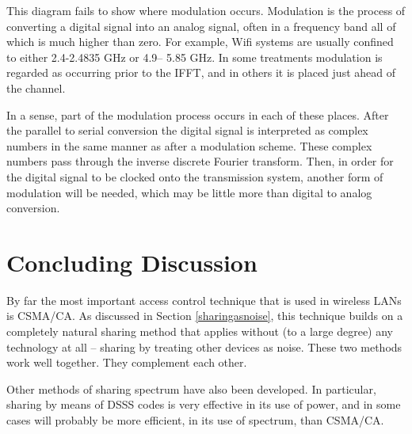 This diagram fails to show where modulation occurs. Modulation is the process of converting
a digital signal into an analog signal, often in a frequency band all of which is much higher
than zero. For example, Wifi systems are usually confined to either 2.4-2.4835 GHz or 4.9–
5.85 GHz. In some treatments modulation is regarded as occurring prior to the IFFT, and in
others it is placed just ahead of the channel.

In a sense, part of the modulation process occurs in each of these places. After the parallel to
serial conversion the digital signal is interpreted as complex numbers in the same manner as
after a modulation scheme. These complex numbers pass through the inverse discrete Fourier
transform. Then, in order for the digital signal to be clocked onto the transmission system,
another form of modulation will be needed, which may be little more than digital to analog
conversion.



\section{Concluding Discussion}

By far the most important access control technique that is used in wireless LANs is
CSMA/CA. As discussed in Section \ref{sharingasnoise}, this technique builds on a
completely natural sharing method that applies without (to a large degree) any
technology at all -- sharing by treating other devices as noise. These two methods
work well together. They complement each other.

Other methods of sharing spectrum have also been developed. In particular, sharing
by means of DSSS codes is very effective in its use of power, and in some cases
will probably be more efficient, in its use of spectrum, than CSMA/CA.

